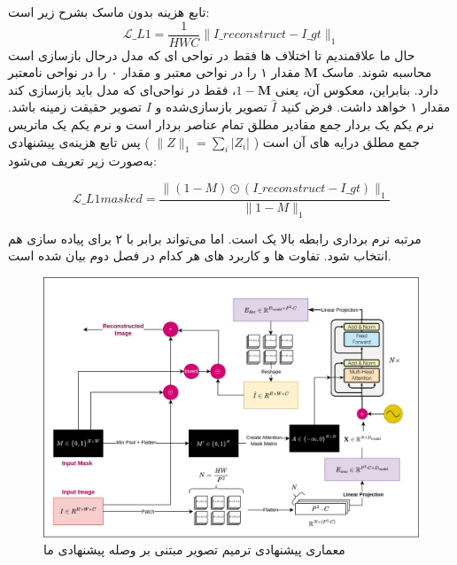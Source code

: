 تابع هزینه  بدون ماسک بشرح زیر است:
$$
\mathcal{L}\_{L1} = \frac{1}{HWC} \| I\_{reconstruct} - I\_{gt} \|_1
$$
حال ما علاقمندیم تا اختلاف ها فقط در نواحی ای که مدل درحال بازسازی است محاسبه شوند.
ماسک $\mathbf{M}$ مقدار ۱ را در نواحی معتبر و مقدار ۰ را در نواحی نامعتبر دارد. بنابراین، معکوس آن، یعنی $1 - \mathbf{M}$، فقط در نواحی‌ای که مدل باید بازسازی کند مقدار ۱ خواهد داشت. فرض کنید $\hat{I}$ تصویر بازسازی‌شده و $I$ تصویر حقیقت زمینه باشد. نرم یکم یک بردار جمع مقادیر مطلق تمام عناصر بردار است و نرم یکم یک ماتریس جمع مطلق درایه های آن است (
$\|Z\|_1​=\sum_i{|Z_i|}$
) پس تابع هزینه‌ی پیشنهادی به‌صورت زیر تعریف می‌شود:

\begin{equation}
 \mathcal{L}\_{L1 masked} = \frac{ \big\| (1 - M) \odot (I\_{reconstruct} - I\_{gt}) \big\|_1 }{ \| 1 - M \|_1}
\end{equation}

مرتبه نرم برداری رابطه بالا یک است. اما می‌تواند برابر با ۲ برای پیاده سازی  هم انتخاب شود. تفاوت ها و کاربرد های هر کدام در فصل دوم بیان شده است.

\begin{figure}
	\centering
	\includegraphics[width=1\linewidth]{ourarch1}
	\caption{معماری پیشنهادی ترمیم تصویر مبتنی بر وصله پیشنهادی ما}
	\label{fig:ourarch1}
\end{figure}




%
%
%
%
%


\warningToSelfUnfinished